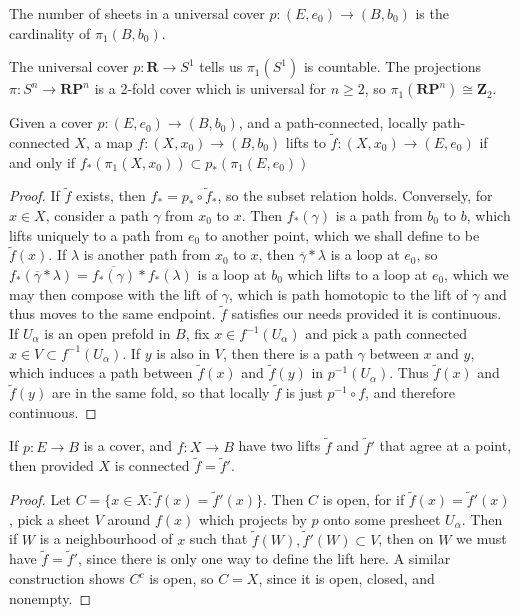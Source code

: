 \begin{corollary}
    The number of sheets in a universal cover $p: (E,e_0) \to (B,b_0)$ is the cardinality of $\pi_1(B,b_0)$.
\end{corollary}

\begin{example}
    The universal cover $p: \mathbf{R} \to S^1$ tells us $\pi_1(S^1)$ is countable. The projections $\pi: S^n \to \mathbf{R} \mathbf{P}^n$ is a 2-fold cover which is universal for $n \geq 2$, so $\pi_1(\mathbf{R} \mathbf{P}^n) \cong \mathbf{Z}_2$.
\end{example}

\begin{theorem}
    Given a cover $p:(E,e_0) \to (B,b_0)$, and a path-connected, locally path-connected $X$, a map $f: (X,x_0) \to (B,b_0)$ lifts to $\tilde{f}: (X,x_0) \to (E,e_0)$ if and only if $f_*(\pi_1(X,x_0)) \subset p_*(\pi_1(E,e_0))$
\end{theorem}
\begin{proof}
    If $\tilde{f}$ exists, then $f_* = p_* \circ \tilde{f}_*$, so the subset relation holds. Conversely, for $x \in X$, consider a path $\gamma$ from $x_0$ to $x$. Then $f_*(\gamma)$ is a path from $b_0$ to $b$, which lifts uniquely to a path from $e_0$ to another point, which we shall define to be $\tilde{f}(x)$. If $\lambda$ is another path from $x_0$ to $x$, then $\overline{\gamma} * \lambda$ is a loop at $e_0$, so $f_*(\overline{\gamma} * \lambda) = \overline{f_*(\gamma)} * f_*(\lambda)$ is a loop at $b_0$ which lifts to a loop at $e_0$, which we may then compose with the lift of $\gamma$, which is path homotopic to the lift of $\gamma$ and thus moves to the same endpoint. $\tilde{f}$ satisfies our needs provided it is continuous. If $U_\alpha$ is an open prefold in $B$, fix $x \in f^{-1}(U_\alpha)$ and pick a path connected $x \in V \subset f^{-1}(U_\alpha)$. If $y$ is also in $V$, then there is a path $\gamma$ between $x$ and $y$, which induces a path between $\tilde{f}(x)$ and $\tilde{f}(y)$ in $p^{-1}(U_\alpha)$. Thus $\tilde{f}(x)$ and $\tilde{f}(y)$ are in the same fold, so that locally $\tilde{f}$ is just $p^{-1} \circ f$, and therefore continuous.
\end{proof}

\begin{lemma}
    If $p: E \to B$ is a cover, and $f: X \to B$ have two lifts $\tilde{f}$ and $\tilde{f}'$ that agree at a point, then provided $X$ is connected $\tilde{f} = \tilde{f}'$.
\end{lemma}
\begin{proof}
    Let $C = \{ x \in X : \tilde{f}(x) = \tilde{f}'(x) \}$. Then $C$ is open, for if $\tilde{f}(x) = \tilde{f}'(x)$, pick a sheet $V$ around $f(x)$ which projects by $p$ onto some presheet $U_\alpha$. Then if $W$ is a neighbourhood of $x$ such that $\tilde{f}(W), \tilde{f}'(W) \subset V$, then on $W$  we must have $\tilde{f} = \tilde{f}'$, since there is only one way to define the lift here. A similar construction shows $C^c$ is open, so $C = X$, since it is open, closed, and nonempty.
\end{proof}


